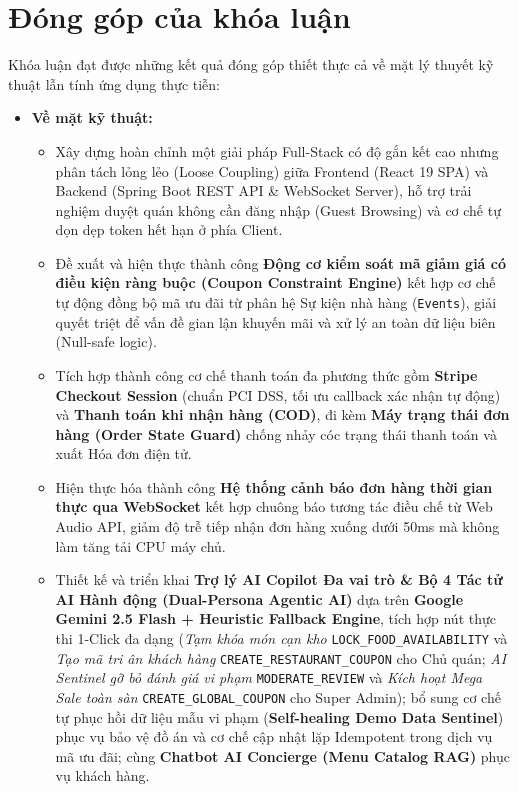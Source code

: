\documentclass{uetgraduation}
\begin{document}
\section{Đóng góp của khóa luận}
Khóa luận đạt được những kết quả đóng góp thiết thực cả về mặt lý thuyết kỹ thuật lẫn tính ứng dụng thực tiễn:
\begin{itemize}
    \item \textbf{Về mặt kỹ thuật:}
    \begin{itemize}
        \item Xây dựng hoàn chỉnh một giải pháp Full-Stack có độ gắn kết cao nhưng phân tách lỏng lẻo (Loose Coupling) giữa Frontend (React 19 SPA) và Backend (Spring Boot REST API \& WebSocket Server), hỗ trợ trải nghiệm duyệt quán không cần đăng nhập (Guest Browsing) và cơ chế tự dọn dẹp token hết hạn ở phía Client.
        \item Đề xuất và hiện thực thành công \textbf{Động cơ kiểm soát mã giảm giá có điều kiện ràng buộc (Coupon Constraint Engine)} kết hợp cơ chế tự động đồng bộ mã ưu đãi từ phân hệ Sự kiện nhà hàng (\texttt{Events}), giải quyết triệt để vấn đề gian lận khuyến mãi và xử lý an toàn dữ liệu biên (Null-safe logic).
        \item Tích hợp thành công cơ chế thanh toán đa phương thức gồm \textbf{Stripe Checkout Session} (chuẩn PCI DSS, tối ưu callback xác nhận tự động) và \textbf{Thanh toán khi nhận hàng (COD)}, đi kèm \textbf{Máy trạng thái đơn hàng (Order State Guard)} chống nhảy cóc trạng thái thanh toán và xuất Hóa đơn điện tử.
        \item Hiện thực hóa thành công \textbf{Hệ thống cảnh báo đơn hàng thời gian thực qua WebSocket} kết hợp chuông báo tương tác điều chế từ Web Audio API, giảm độ trễ tiếp nhận đơn hàng xuống dưới 50ms mà không làm tăng tải CPU máy chủ.
        \item Thiết kế và triển khai \textbf{Trợ lý AI Copilot Đa vai trò \& Bộ 4 Tác tử AI Hành động (Dual-Persona Agentic AI)} dựa trên \textbf{Google Gemini 2.5 Flash + Heuristic Fallback Engine}, tích hợp nút thực thi 1-Click đa dạng (\textit{Tạm khóa món cạn kho} \texttt{LOCK\_FOOD\_AVAILABILITY} và \textit{Tạo mã tri ân khách hàng} \texttt{CREATE\_RESTAURANT\_COUPON} cho Chủ quán; \textit{AI Sentinel gỡ bỏ đánh giá vi phạm} \texttt{MODERATE\_REVIEW} và \textit{Kích hoạt Mega Sale toàn sàn} \texttt{CREATE\_GLOBAL\_COUPON} cho Super Admin); bổ sung cơ chế tự phục hồi dữ liệu mẫu vi phạm (\textbf{Self-healing Demo Data Sentinel}) phục vụ bảo vệ đồ án và cơ chế cập nhật lặp Idempotent trong dịch vụ mã ưu đãi; cùng \textbf{Chatbot AI Concierge (Menu Catalog RAG)} phục vụ khách hàng.

\end{itemize}
\end{itemize}
\end{document}
